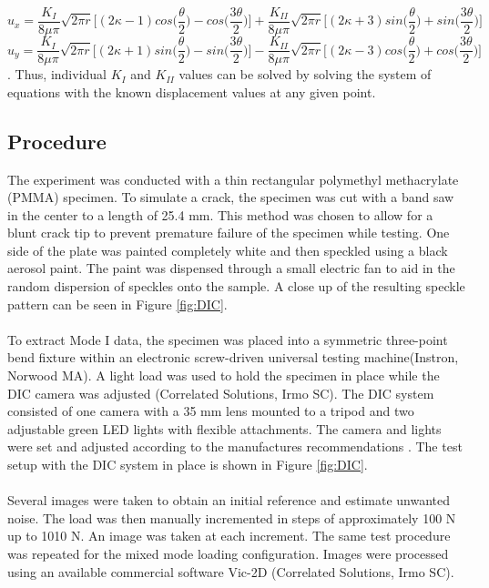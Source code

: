\documentclass[12pt]{article}
\begin{document}
\begin{equation}
u_{x} = \frac{K_{I}}{8\mu \pi}\sqrt{2\pi r}\bigg[(2\kappa-1)cos\bigg(\frac{\theta}{2}\bigg)-cos\bigg(\frac{3\theta}{2}\bigg)\bigg] + \frac{K_{II}}{8\mu \pi}\sqrt{2\pi r}\bigg[(2\kappa+3)sin\bigg(\frac{\theta}{2}\bigg)+sin\bigg(\frac{3\theta}{2}\bigg)\bigg]
\end{equation}
\begin{equation}
u_{y} = \frac{K_{I}}{8\mu \pi}\sqrt{2\pi r}\bigg[(2\kappa+1)sin\bigg(\frac{\theta}{2}\bigg)-sin\bigg(\frac{3\theta}{2}\bigg)\bigg]-\frac{K_{II}}{8\mu \pi}\sqrt{2\pi r}\bigg[(2\kappa-3)cos\bigg(\frac{\theta}{2}\bigg)+cos\bigg(\frac{3\theta}{2}\bigg)\bigg]
\end{equation} \cite{Fracture}.
Thus, individual $K_{I}$ and $K_{II}$ values can be solved by solving the system of equations with the known displacement values at any given point.
    
\subsection{Procedure} %
The experiment was conducted with a thin rectangular polymethyl methacrylate (PMMA) specimen. To simulate a crack, the specimen was cut with a band saw in the center to a length of 25.4 mm. This method was chosen to allow for a blunt crack tip to prevent premature failure of the specimen while testing. One side of the plate was painted  completely white and then speckled using a black aerosol paint. The paint was dispensed through a small electric fan to aid in the random dispersion of speckles onto the sample. A close up of the resulting speckle pattern can be seen in Figure \ref{fig:DIC}.
\\ \\
To extract Mode I data, the specimen was placed into a symmetric three-point bend fixture within an electronic screw-driven universal testing machine(Instron, Norwood MA). A light load was used to hold the specimen in place while the DIC camera was adjusted (Correlated Solutions, Irmo SC). The DIC system consisted of one camera with a 35 mm lens mounted to a tripod and two adjustable green LED lights with flexible attachments. The camera and lights were set and adjusted according to the manufactures recommendations \cite{DIC_Test}. The test setup with the DIC system in place is shown in Figure \ref{fig:DIC}.
\\ \\
Several images were taken to obtain an initial reference and estimate unwanted noise. The load was then manually incremented in steps of approximately 100 N up to 1010 N. An image was taken at each increment. The same test procedure was repeated for the mixed mode loading configuration. Images were processed using an available commercial software Vic-2D (Correlated Solutions, Irmo SC). 
\end{document}
